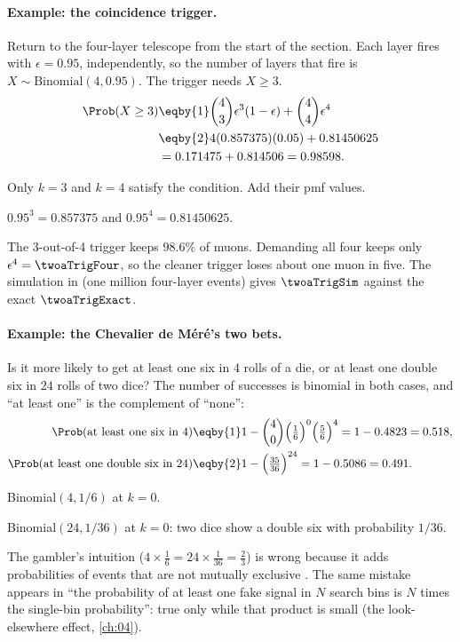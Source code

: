 \paragraph{Example: the coincidence trigger.}
Return to the four-layer telescope from the start of the section. Each layer fires with $\epsilon=0.95$, independently, so the number of layers that fire is $X\sim\mathrm{Binomial}(4,0.95)$. The trigger needs $X\ge3$.
\begin{align*}
  \Prob(X\ge3) &\eqby{1} \binom43\epsilon^3(1-\epsilon)+\binom44\epsilon^4 \\
  &\eqby{2} 4(0.857375)(0.05)+0.81450625 \\
  &= 0.171475+0.814506 = 0.98598 .
\end{align*}
\begin{explain}
  \item Only $k=3$ and $k=4$ satisfy the condition. Add their pmf values.
  \item $0.95^3=0.857375$ and $0.95^4=0.81450625$.
\end{explain}
The 3-out-of-4 trigger keeps $98.6\%$ of muons. Demanding all four keeps only $\epsilon^4=\twoaTrigFour$, so the cleaner trigger loses about one muon in five. The simulation in  (one million four-layer events) gives $\twoaTrigSim$ against the exact $\twoaTrigExact$.

\paragraph{Example: the Chevalier de M\'er\'e's two bets.}
Is it more likely to get at least one six in $4$ rolls of a die, or at least one double six in $24$ rolls of two dice? The number of successes is binomial in both cases, and ``at least one'' is the complement of ``none'':
\begin{align*}
  \Prob(\text{at least one six in }4) &\eqby{1} 1-\binom40\Bigl(\tfrac16\Bigr)^0\Bigl(\tfrac56\Bigr)^4 = 1-0.4823 = 0.518,\\
  \Prob(\text{at least one double six in }24) &\eqby{2} 1-\Bigl(\tfrac{35}{36}\Bigr)^{24} = 1-0.5086 = 0.491 .
\end{align*}
\begin{explain}
  \item Binomial$(4,1/6)$ at $k=0$.
  \item Binomial$(24,1/36)$ at $k=0$: two dice show a double six with probability $1/36$.
\end{explain}
The gambler's intuition ($4\times\tfrac16=24\times\tfrac1{36}=\tfrac23$) is wrong because it adds probabilities of events that are not mutually exclusive . The same mistake appears in ``the probability of at least one fake signal in $N$ search bins is $N$ times the single-bin probability'': true only while that product is small (the look-elsewhere effect, \cref{ch:04}).

